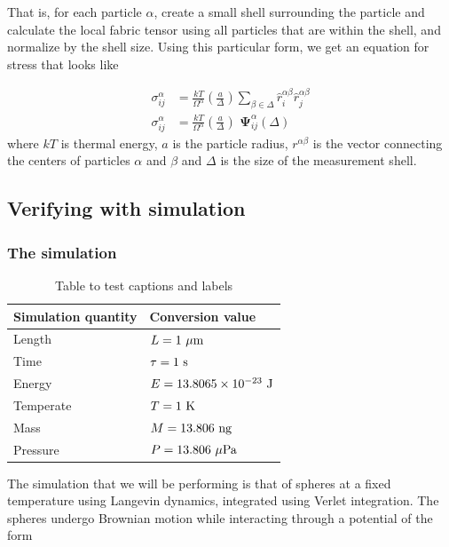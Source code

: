 \documentclass[twocolumn,amsmath,amssymb]{revtex4}
\begin{document}
That is, for each particle $\alpha$, create a small shell surrounding the
particle and calculate the local fabric tensor using all particles that are
within the shell, and normalize by the shell size. Using this particular form,
we get an equation for stress that looks like

\begin{align*}
    \sigma^{\alpha}_{ij} &= \frac{kT}{\Omega^{\alpha}} \left(\frac{a}{\Delta}\right) \sum_{\beta \in \Delta} \hat{r}^{\alpha\beta}_{i}\hat{r}^{\alpha\beta}_{j}\\
    \sigma^{\alpha}_{ij} &= \frac{kT}{\Omega^{\alpha}} \left(\frac{a}{\Delta}\right) \,\, \mathbf{\Psi}^{\alpha}_{ij}(\Delta)
\end{align*}
where $kT$ is thermal energy, $a$ is the particle radius, $r^{\alpha\beta}$ is
the vector connecting the centers of particles $\alpha$ and $\beta$ and
$\Delta$ is the size of the measurement shell.

\subsection{Verifying with simulation}

\subsubsection{The simulation}

\begin{table}
\centering
\begin{tabular}{||l l||}
    \hline
    Simulation quantity & Conversion value \\ \hline\hline
    Length      & $L = 1~\mu\rm{m}$                     \\ \hline
    Time        & $\tau = 1~\rm{s}$                     \\ \hline
    Energy      & $E = 13.8065\times10^{-23}~\rm{J}$    \\ \hline
    Temperate   & $T = 1~\rm{K}$                        \\ \hline
    Mass        & $M = 13.806~\rm{ng}$                  \\ \hline
    Pressure    & $P = 13.806~\rm{\mu Pa}$              \\ \hline
\end{tabular}
\caption{Table to test captions and labels}
\label{table:simunits}
\end{table}

The simulation that we will be performing is that of spheres at a fixed temperature
using Langevin dynamics, integrated using Verlet integration.  The spheres undergo
Brownian motion while interacting through a potential of the form
\end{document}
